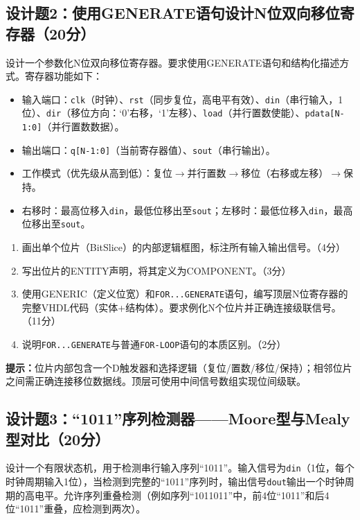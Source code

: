 \subsection*{设计题2：使用GENERATE语句设计N位双向移位寄存器（20分）}

设计一个参数化N位双向移位寄存器。要求使用GENERATE语句和结构化描述方式。寄存器功能如下：

\begin{itemize}
  \item 输入端口：\texttt{clk}（时钟）、\texttt{rst}（同步复位，高电平有效）、\texttt{din}（串行输入，1位）、\texttt{dir}（移位方向：`0'右移，`1'左移）、\texttt{load}（并行置数使能）、\texttt{pdata[N-1:0]}（并行置数数据）。
  \item 输出端口：\texttt{q[N-1:0]}（当前寄存器值）、\texttt{sout}（串行输出）。
  \item 工作模式（优先级从高到低）：复位$\rightarrow$并行置数$\rightarrow$移位（右移或左移）$\rightarrow$保持。
  \item 右移时：最高位移入\texttt{din}，最低位移出至\texttt{sout}；左移时：最低位移入\texttt{din}，最高位移出至\texttt{sout}。
\end{itemize}

\begin{enumerate}[label=(\arabic*)]
  \item 画出单个位片（BitSlice）的内部逻辑框图，标注所有输入输出信号。（4分）
  \item 写出位片的ENTITY声明，将其定义为COMPONENT。（3分）
  \item 使用GENERIC（定义位宽）和\texttt{FOR...GENERATE}语句，编写顶层N位寄存器的完整VHDL代码（实体+结构体）。要求例化N个位片并正确连接级联信号。（11分）
  \item 说明\texttt{FOR...GENERATE}与普通\texttt{FOR-LOOP}语句的本质区别。（2分）
\end{enumerate}

\begin{framed}
\textbf{提示：}位片内部包含一个D触发器和选择逻辑（复位/置数/移位/保持）；相邻位片之间需正确连接移位数据线。顶层可使用中间信号数组实现位间级联。
\end{framed}

\subsection*{设计题3：``1011''序列检测器——Moore型与Mealy型对比（20分）}

设计一个有限状态机，用于检测串行输入序列``1011''。输入信号为\texttt{din}（1位，每个时钟周期输入1位），当检测到完整的``1011''序列时，输出信号\texttt{dout}输出一个时钟周期的高电平。允许序列重叠检测（例如序列``1011011''中，前4位``1011''和后4位``1011''重叠，应检测到两次）。

